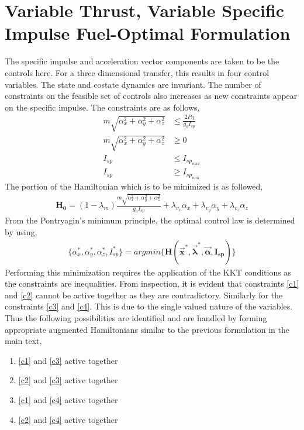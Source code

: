 
\chapter{Variable Thrust, Variable Specific Impulse Fuel-Optimal Formulation}
\label{app3}
\ifpdf
\graphicspath{{Appendix2/}{Appendix3/}{Appendix3/}}
\else
\graphicspath{{Appendix3/}{Appendix3/}}
\fi

The specific impulse and acceleration vector components are taken to be the controls here. For a three dimensional transfer, this results in four control variables. The state and costate dynamics are invariant. The number of constraints on the feasible set of controls also increases as new constraints appear on the specific impulse. The constraints are as follows,
\begin{align}
	m\sqrt{\alpha_x^2+\alpha_y^2+\alpha_z^2}&\leq \frac{2P\eta}{g_0 I_{sp}}\label{c1}\\
	m\sqrt{\alpha_x^2+\alpha_y^2+\alpha_z^2}&\geq 0\label{c2}\\
	I_{sp}&\leq I_{sp_{max}}\label{c3}\\
	I_{sp}&\geq I_{sp_{min}}\label{c4}
\end{align}
The portion of the Hamiltonian which is to be minimized is as followed,
\begin{align}
	\boldsymbol{H_0}=(1-\lambda_m)\frac{m\sqrt{\alpha_x^2+\alpha_y^2+\alpha_z^2}}{g_0 I_{sp}}+\lambda_{v_x}\alpha_x+\lambda_{v_y}\alpha_y+\lambda_{v_z}\alpha_z
\end{align}
From the Pontryagin's minimum principle, the optimal control law is determined by using,
\begin{align}
	\{\alpha_x^*,\alpha_y^*,\alpha_z^*,I_{sp}^*\}=argmin\{\boldsymbol{H(\vec{x}^*,\vec{\lambda}^*,\vec{\alpha},I_{sp})}\}
\end{align}
Performing this minimization requires the application of the KKT conditions as the constraints are inequalities. From inspection, it is evident  that constraints \ref{c1} and \ref{c2} cannot be active together as they are contradictory. Similarly for the constraints \ref{c3} and \ref{c4}. This is due to the single valued nature of the variables. Thus the following possibilities are identified and are handled by forming appropriate augmented Hamiltonians similar to the previous formulation in the main text,
\begin{enumerate}[label=(\alph*)]
	\item \ref{c1} and \ref{c3} active together
	\item \ref{c2} and \ref{c3} active together
	\item \ref{c1} and \ref{c4} active together
	\item \ref{c2} and \ref{c4} active together
\end{enumerate}
